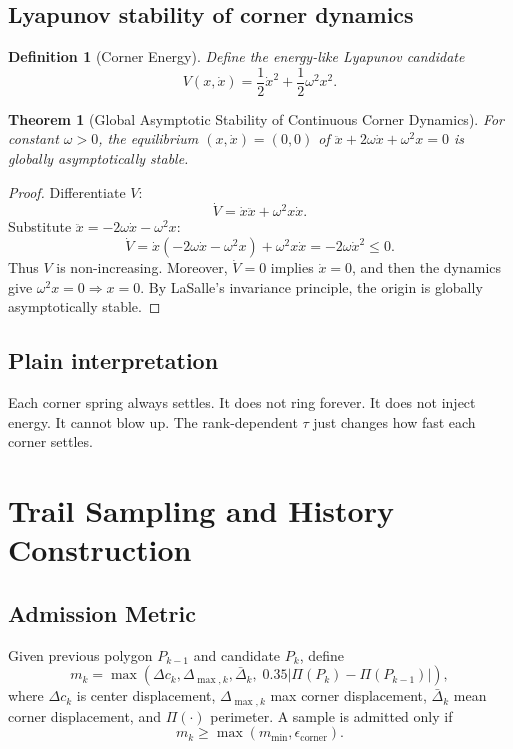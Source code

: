 \documentclass[journal]{IEEEtran}
\newtheorem{definition}{Definition}
\newtheorem{theorem}{Theorem}
\begin{document}
\subsection{Lyapunov stability of corner dynamics}

\begin{definition}[Corner Energy]
Define the energy-like Lyapunov candidate
\begin{equation}
V(x,\dot{x})=\frac{1}{2}\dot{x}^2+\frac{1}{2}\omega^2 x^2.
\end{equation}
\end{definition}

\begin{theorem}[Global Asymptotic Stability of Continuous Corner Dynamics]
For constant \(\omega>0\), the equilibrium \((x,\dot{x})=(0,0)\) of
\(\ddot{x}+2\omega\dot{x}+\omega^2x=0\)
is globally asymptotically stable.
\end{theorem}

\begin{proof}
Differentiate \(V\):
\[
\dot{V}=\dot{x}\ddot{x}+\omega^2 x\dot{x}.
\]
Substitute \(\ddot{x}=-2\omega\dot{x}-\omega^2x\):
\[
\dot{V}=\dot{x}(-2\omega\dot{x}-\omega^2x)+\omega^2x\dot{x}=-2\omega \dot{x}^2\le 0.
\]
Thus \(V\) is non-increasing. Moreover, \(\dot{V}=0\) implies \(\dot{x}=0\), and then the dynamics give \(\omega^2x=0\Rightarrow x=0\). By LaSalle's invariance principle, the origin is globally asymptotically stable.
\end{proof}

\subsection{Plain interpretation}
Each corner spring always settles. It does not ring forever. It does not inject energy. It cannot blow up. The rank-dependent \(\tau\) just changes how fast each corner settles.

\section{Trail Sampling and History Construction}

\subsection{Admission Metric}
Given previous polygon \(P_{k-1}\) and candidate \(P_k\), define
\begin{equation}
m_k=\max\!\left(\Delta c_k,\Delta_{\max,k},\bar{\Delta}_k,\;0.35\left|\Pi(P_k)-\Pi(P_{k-1})\right|\right),
\end{equation}
where \(\Delta c_k\) is center displacement, \(\Delta_{\max,k}\) max corner displacement, \(\bar{\Delta}_k\) mean corner displacement, and \(\Pi(\cdot)\) perimeter. A sample is admitted only if
\begin{equation}
m_k \ge \max(m_{\min}, \epsilon_{\text{corner}}).
\end{equation}
\end{document}
